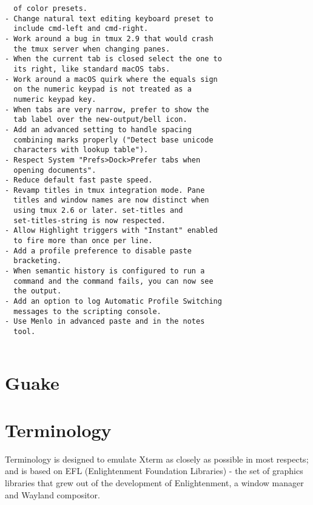 \begin{verbatim}
  of color presets.
- Change natural text editing keyboard preset to
  include cmd-left and cmd-right.
- Work around a bug in tmux 2.9 that would crash
  the tmux server when changing panes.
- When the current tab is closed select the one to
  its right, like standard macOS tabs.
- Work around a macOS quirk where the equals sign
  on the numeric keypad is not treated as a
  numeric keypad key.
- When tabs are very narrow, prefer to show the
  tab label over the new-output/bell icon.
- Add an advanced setting to handle spacing
  combining marks properly ("Detect base unicode
  characters with lookup table").
- Respect System "Prefs>Dock>Prefer tabs when
  opening documents".
- Reduce default fast paste speed.
- Revamp titles in tmux integration mode. Pane
  titles and window names are now distinct when
  using tmux 2.6 or later. set-titles and
  set-titles-string is now respected. 
- Allow Highlight triggers with "Instant" enabled
  to fire more than once per line.
- Add a profile preference to disable paste
  bracketing.
- When semantic history is configured to run a
  command and the command fails, you can now see
  the output.
- Add an option to log Automatic Profile Switching
  messages to the scripting console.
- Use Menlo in advanced paste and in the notes
  tool.


\end{verbatim}

\section{Guake}
\label{sec:guake}


\section{Terminology}
\label{sec:Terminology-terminal-emulator}

Terminology is designed to emulate Xterm as closely as possible in most
respects; and is based on EFL (Enlightenment Foundation Libraries) - the set of
graphics libraries that grew out of the development of Enlightenment, a window
manager and Wayland compositor.






